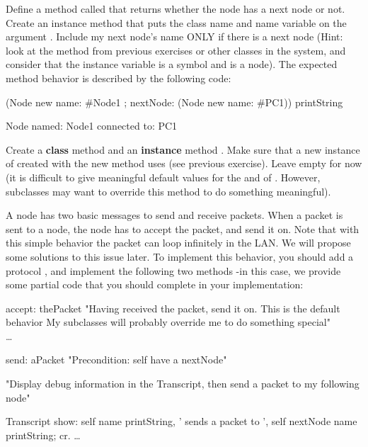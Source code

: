 \exercise  Define a method called  that
returns whether the node has a next node or not. \\

\exercise  Create an instance method  that puts
the class name and name variable on the argument
. Include my next node's name ONLY if there is a
next node (Hint: look at the method  from
previous exercises or other classes in the system, and consider that the instance variable
 is a symbol and  is a node). The expected  method behavior is described by the following code:

\begin{scode}
(Node new
   name: \#Node1 ;
   nextNode: (Node new name: \#PC1)) printString

Node named: Node1 connected to: PC1
\end{scode}

\exercise  Create a \textbf{class} method  and an
\textbf{instance} method . Make sure that a new
instance of  created with the new method uses
 (see previous exercise). Leave
 empty for now (it is difficult to give meaningful
default values for the  and  of
. However, subclasses may want to override this
method to do something meaningful).

\exercise  A node has two basic messages to send and receive
packets. When a packet is sent to a node, the node has to accept
the packet, and send it on. Note that with this simple behavior
the packet can loop infinitely in the LAN. We will propose some
solutions to this issue later. To
implement this behavior, you should add a protocol
, and implement the following two methods -in
this case, we provide some partial code that you should complete
in your implementation:

\begin{scode}
accept: thePacket
 "Having received the packet, send it on. This is the default
behavior My subclasses will probably override me to do
something special"\\
    \dots

send: aPacket
     "Precondition: self have a nextNode"

     "Display debug information in the Transcript, then
     send a packet to my following node"

     Transcript show:
               self name printString,
               ' sends a packet to ',
               self nextNode name printString; cr.
\dots
\end{scode}

